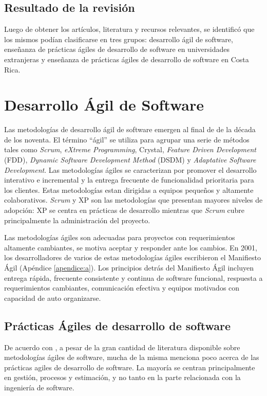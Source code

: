 \documentclass[journal]{IEEEtran}
\begin{document}
\subsection{Resultado de la revisión} \label{sec:resultado-rev-lit}
Luego de obtener los artículos, literatura y recursos relevantes, se identificó que los mismos podían clasificarse en tres grupos: desarrollo ágil de software, enseñanza de prácticas ágiles de desarrollo de software en universidades extranjeras y enseñanza de prácticas ágiles de desarrollo de software en Costa Rica.



\section{Desarrollo Ágil de Software} \label{sec:desarrollo-agil}
Las metodologías de desarrollo ágil de software emergen al final de de la década de los noventa. El término ``ágil'' se utiliza para agrupar una serie de métodos tales como \emph{Scrum}, \emph{eXtreme Programming}, Crystal, \emph{Feature Driven Development} (FDD), \emph{Dynamic Software Development Method} (DSDM) y \emph{Adaptative Software Development}\cite{rashina-et-al}. Las metodologías ágiles se caracterizan por promover el desarrollo interativo e incremental y la entrega frecuente de funcionalidad prioritaria para los clientes. Estas metodologías estan dirigidas a equipos pequeños y altamente colaborativos. \emph{Scrum} y XP son las metodologías que presentan mayores niveles de adopción\cite{version-one}: XP se centra en prácticas de desarrollo mientras que \emph{Scrum} cubre principalmente la administración del proyecto.

Las metodologías ágiles son adecuadas para proyectos con requerimientos altamente cambiantes, se motiva aceptar y responder ante los cambios. En 2001, los desarrolladores de varios de estas metodologías ágiles escribieron el Manifiesto Ágil \cite{agile-manifesto} (Apéndice \ref{apendice:a}). Los principios detrás del Manifiesto Ágil incluyen entrega rápida, frecuente consistente y continua de software funcional, respuesta a requerimientos cambiantes, comunicación efectiva y equipos motivados con capacidad de auto organizarse.

\subsection{Prácticas Ágiles de desarrollo de software} \label{sec:practicas-agiles-desarrollo}
De acuerdo con \cite{ford}, a pesar de la gran cantidad de literatura disponible sobre metodologías ágiles de software, mucha de la misma menciona poco acerca de las prácticas agiles de desarrollo de software. La mayoría se centran principalmente en gestión, procesos y estimación, y no tanto en la parte relacionada con la ingeniería de software.
\end{document}
